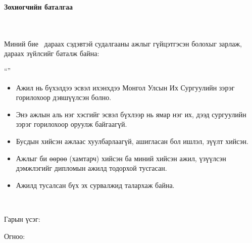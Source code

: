 \makefrontpage
\maketitle

\doublespace

\begin{huge}
\textbf{Зохиогчийн баталгаа}
\end{huge} \\ \ \\ 
\doublespace
Миний бие \@author\ дараах сэдэвтэй судалгааны ажлыг гүйцэтгэсэн болохыг зарлаж, дараах зүйлсийг баталж байна:

\begin{center}
``\@title''
\end{center}
\begin{itemize}
\item Ажил нь бүхэлдээ эсвэл ихэнхдээ Монгол Улсын Их Сургуулийн зэрэг горилохоор дэвшүүлсэн болно.
\item Энэ ажлын аль нэг хэсгийг эсвэл бүхлээр нь ямар нэг их, дээд сургуулийн зэрэг горилохоор оруулж байгаагүй.
\item Бусдын хийсэн ажлаас хуулбарлаагүй, ашигласан бол ишлэл, зүүлт хийсэн.
\item Ажлыг би өөрөө (хамтарч) хийсэн ба миний хийсэн ажил, үзүүлсэн дэмжлэгийг дипломын ажилд тодорхой тусгасан. 
\item Ажилд тусалсан бүх эх сурвалжид талархаж байна. 
\end{itemize} 
\ 

Гарын үсэг: \underline{\hspace{5cm}} 

Огноо: 	\ \ \underline{\hspace{3cm}}

\clearpage


\setcounter{tocdepth}{1}
\tableofcontents

\listoffigures

\listoftables

\lstlistoflistings

\newpage
\newpage

\renewcommand{\cftlabel}{Зураг}


\doublespace
{}
